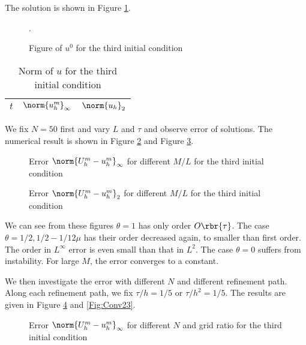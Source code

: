 \documentclass[english, nochinese]{pnote}
\begin{document}
The solution is shown in Figure \ref{Fig:Sol3}.

\begin{figure}[htbp]
\centering

\caption{Figure of $u^0$ for the third initial condition}.
\label{Fig:Sol3}
\end{figure}

\begin{table}[htbp]
\centering
\begin{tabular}{|c|c|c|}
\hline
$t$ & $\norm{u_h^m}_{\infty}$ & $\norm{u_h}_2$ \\
\hline

\end{tabular}
\caption{Norm of $u$ for the third initial condition}
\label{Tbl:Decay3}
\end{table}

We fix $ N = 50 $ first and vary $L$ and $\tau$ and observe error of solutions. The numerical result is shown in Figure \ref{Fig:ErrI3} and Figure \ref{Fig:Err23}.

\begin{figure}
\centering
\scalebox{0.75}{}
\caption{Error $ \norm{ U_h^m - u_h^m }_{\infty} $ for different $ M / L $ for the third initial condition}
\label{Fig:ErrI3}
\end{figure}

\begin{figure}
\centering
\scalebox{0.75}{}
\caption{Error $ \norm{ U_h^m - u_h^m }_2 $ for different $ M / L $ for the third initial condition}
\label{Fig:Err23}
\end{figure}

We can see from these figures $ \theta = 1 $ has only order $ O \rbr{\tau} $. The case $ \theta = 1 / 2, 1 / 2 - 1 / 12 \mu $ has their order decreased again, to smaller than first order. The order in $L^{\infty}$ error is even small than that in $L^2$. The case $ \theta = 0 $ suffers from instability. For large $M$, the error converges to a constant.

We then investigate the error with different $N$ and different refinement path. Along each refinement path, we fix $ \tau / h = 1 / 5 $ or $ \tau / h^2 = 1 / 5 $. The results are given in Figure \ref{Fig:ConvI3} and \ref{Fig:Conv23}. 

\begin{figure}
\centering
\scalebox{0.75}{}
\caption{Error $ \norm{ U_h^m - u_h^m }_{\infty} $ for different $N$ and grid ratio for the third initial condition}
\label{Fig:ConvI3}
\end{figure}
\end{document}
